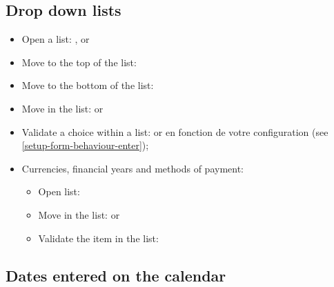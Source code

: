 \subsection{Drop down lists}%

\begin{itemize}
	\item Open a list: ,  or \keys{\arrowkeydown}
	\item Move to the top of the list: %
	\item Move to the bottom of the list: 
	\item Move in the list: \keys{\arrowkeyup} or \keys{\arrowkeydown}
	\item Validate a choice within a list:  or  en fonction de votre configuration (see \vref{setup-form-behaviour-enter});
	\item Currencies, financial years and methods of payment:%
	\begin{itemize}
		\item Open list: %
		\item Move in the list: \keys{\arrowkeyup} or \keys{\arrowkeydown}%
		\item Validate the item in the list: %
	\end{itemize}
\end{itemize}

\subsection{Dates entered on the calendar}%

